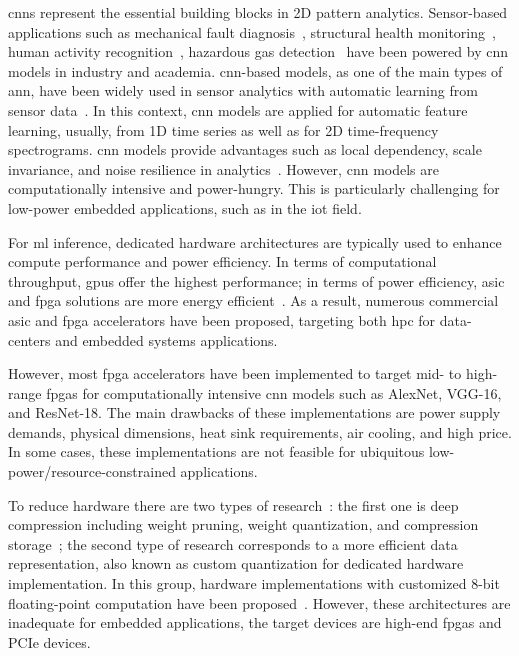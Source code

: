 \glspl{cnn} represent the essential building blocks in 2D pattern analytics. Sensor-based applications such as mechanical fault diagnosis~\cite{li2019sensor,dong2018rolling}, structural health monitoring~\cite{nagayama2007structural}, human activity recognition~\cite{wang2019deep}, hazardous gas detection~\cite{kim2017hazardous} have been powered by \gls{cnn} models in industry and academia. \gls{cnn}-based models, as one of the main types of \gls{ann}, have been widely used in sensor analytics with automatic learning from sensor data~\cite{ince2016real, janssens2016convolutional, abdeljaber2017real, guo2016hierarchical}. In this context, \gls{cnn} models are applied for automatic feature learning, usually, from 1D time series as well as for 2D time-frequency spectrograms. \gls{cnn} models provide advantages such as local dependency, scale invariance, and noise resilience in analytics~\cite{du2014leveraging}. However, \gls{cnn} models are computationally intensive and power-hungry. This is particularly challenging for low-power embedded applications, such as in the \gls{iot} field.

For \gls{ml} inference, dedicated hardware architectures are typically used to enhance compute performance and power efficiency. In terms of computational throughput, \glspl{gpu} offer the highest performance; in terms of power efficiency, \gls{asic} and \gls{fpga} solutions are more energy efficient~\cite{nurvitadhi2017can}. As a result, numerous commercial \gls{asic} and \gls{fpga} accelerators have been proposed, targeting both \gls{hpc} for data-centers and embedded systems applications.

However, most \gls{fpga} accelerators have been implemented to target mid- to high-range \glspl{fpga} for computationally intensive \gls{cnn} models such as AlexNet, VGG-16, and ResNet-18. The main drawbacks of these implementations are power supply demands, physical dimensions, heat sink requirements, air cooling, and high price. In some cases, these implementations are not feasible for ubiquitous low-power/resource-constrained applications.

To reduce hardware there are two types of research~\cite{wu2021low}: the first one is deep compression including weight pruning, weight quantization, and compression storage~\cite{han2015deep,han2015learning}; the second type of research corresponds to a more efficient data representation, also known as custom quantization for dedicated hardware implementation. In this group, hardware implementations with customized 8-bit floating-point computation have been proposed~\cite{mei2017200mhz, wu2021low, lian2019high}. However, these architectures are inadequate for embedded applications, the target devices are high-end \glspl{fpga} and PCIe devices.

